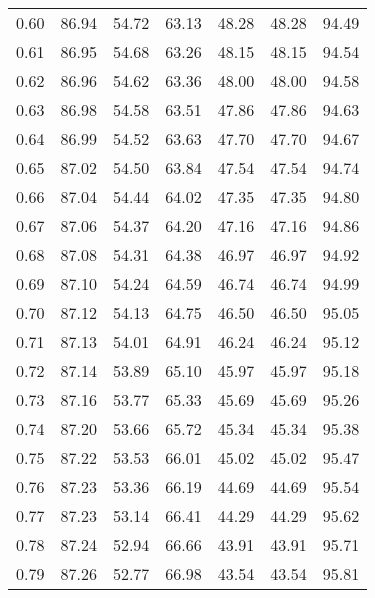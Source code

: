 \begin{tabular}{|c|c|c|c|c|c|c|}
      0.60 &     86.94 &     54.72 &      63.13 &   48.28 &      48.28 &         94.49 \\
      0.61 &     86.95 &     54.68 &      63.26 &   48.15 &      48.15 &         94.54 \\
      0.62 &     86.96 &     54.62 &      63.36 &   48.00 &      48.00 &         94.58 \\
      0.63 &     86.98 &     54.58 &      63.51 &   47.86 &      47.86 &         94.63 \\
      0.64 &     86.99 &     54.52 &      63.63 &   47.70 &      47.70 &         94.67 \\
      0.65 &     87.02 &     54.50 &      63.84 &   47.54 &      47.54 &         94.74 \\
      0.66 &     87.04 &     54.44 &      64.02 &   47.35 &      47.35 &         94.80 \\
      0.67 &     87.06 &     54.37 &      64.20 &   47.16 &      47.16 &         94.86 \\
      0.68 &     87.08 &     54.31 &      64.38 &   46.97 &      46.97 &         94.92 \\
      0.69 &     87.10 &     54.24 &      64.59 &   46.74 &      46.74 &         94.99 \\
      0.70 &     87.12 &     54.13 &      64.75 &   46.50 &      46.50 &         95.05 \\
      0.71 &     87.13 &     54.01 &      64.91 &   46.24 &      46.24 &         95.12 \\
      0.72 &     87.14 &     53.89 &      65.10 &   45.97 &      45.97 &         95.18 \\
      0.73 &     87.16 &     53.77 &      65.33 &   45.69 &      45.69 &         95.26 \\
      0.74 &     87.20 &     53.66 &      65.72 &   45.34 &      45.34 &         95.38 \\
      0.75 &     87.22 &     53.53 &      66.01 &   45.02 &      45.02 &         95.47 \\
      0.76 &     87.23 &     53.36 &      66.19 &   44.69 &      44.69 &         95.54 \\
      0.77 &     87.23 &     53.14 &      66.41 &   44.29 &      44.29 &         95.62 \\
      0.78 &     87.24 &     52.94 &      66.66 &   43.91 &      43.91 &         95.71 \\
      0.79 &     87.26 &     52.77 &      66.98 &   43.54 &      43.54 &         95.81 \\

\end{tabular}
